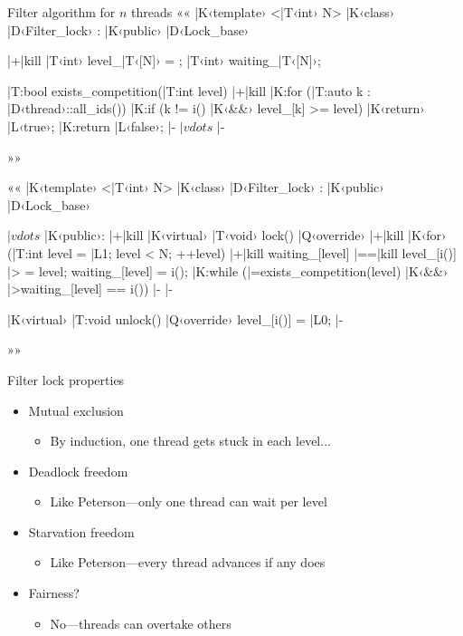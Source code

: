 \documentclass{beamer}
\begin{document}
\begin{frame}
\thispagestyle{empty}\centering
{}
\end{frame}

\begin{frame}[fragile]{Filter algorithm for $n$ threads}{}
  ««
  |K‹template› <|T‹int› N>
  |K‹class› |D‹Filter_lock› : |K‹public› |D‹Lock_base›
  {
  	|+|kill%
    |T‹int› level_|T‹[N]› = {};
    |T‹int› waiting_|T‹[N]›;

    |T:bool exists_competition(|T:int level)
    {
    	|+|kill%
      |K:for (|T:auto k : |D‹thread›::all_ids())
      	|K:if (k != i() |K‹&&› level_[k] >= level)
      		|K‹return› |L‹true›;
      |K:return |L‹false›; |-
    }
    $|vdots$ |-
  }
  »»
\end{frame}

\begin{frame}[fragile]{}{}
  ««
  |K‹template› <|T‹int› N>
  |K‹class› |D‹Filter_lock› : |K‹public› |D‹Lock_base›
  {
  $|vdots$
  |K‹public›:
  	|+|kill%
    |K‹virtual› |T‹void› lock() |Q‹override›
    {
    	|+|kill%
      |K‹for› (|T:int level = |L1; level < N; ++level) {
      	|+|kill%
        waiting_[level] |==|kill%
        level_[i()] |> = level;
        waiting_[level] = i();
        |K:while (|=exists_competition(level) |K‹&&›
                  |>waiting_[level] == i()) {} |-
      } |-
    }
    
    |K‹virtual› |T:void unlock() |Q‹override›
    { level_[i()] = |L0; } |-
  }
  »»
\end{frame}

\begin{frame}{Filter lock properties}
  \begin{itemize}
    \item Mutual exclusion
      \begin{itemize}
        \item By induction, one thread gets stuck in each level...
      \end{itemize}
    \item Deadlock freedom
      \begin{itemize}
        \item Like Peterson—only one thread can wait per level
      \end{itemize}
    \item Starvation freedom
      \begin{itemize}
        \item Like Peterson—every thread advances if any does
      \end{itemize}
    \pause
  \item Fairness?
    \begin{itemize}
      \item No—threads can overtake others
    \end{itemize}
  \end{itemize}
\end{frame}
\end{document}
